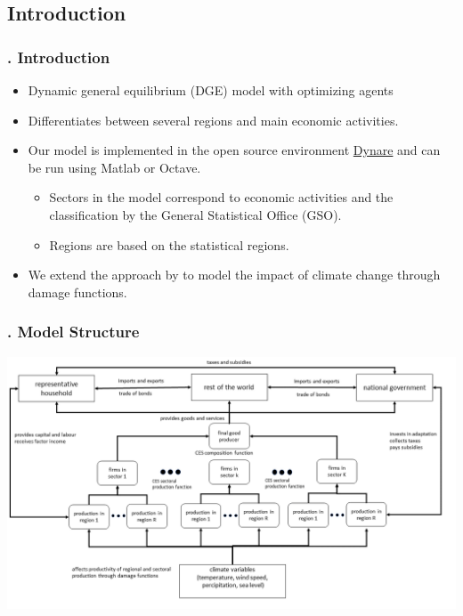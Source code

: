 \documentclass[11pt,aspectratio=169]{beamer}
\begin{document}
\subsection{Introduction}
\begin{frame}[plain]
\frametitle{{\thesection.\thesubsection} Introduction}
\begin{itemize}
\item Dynamic general equilibrium (DGE) model with optimizing agents
\item Differentiates between several regions and main economic activities.
\item Our model is implemented in the open source environment \href{https://www.dynare.org/}{Dynare} and can be run using Matlab or Octave.
\begin{itemize}
	\item Sectors in the model correspond to economic activities and the classification by the General Statistical Office (GSO).
	\item Regions are based on the statistical regions.
\end{itemize}
\item We extend the approach by \cite{nordhaus1993optimal} to model the impact of climate change through damage functions.
\end{itemize}
\end{frame}

\begin{frame}[plain]
\frametitle{{\thesection.\thesubsection} Model Structure}
\includegraphics[width = 1\textwidth]{pictures/Model_Structure.png}
\end{frame}
\end{document}
